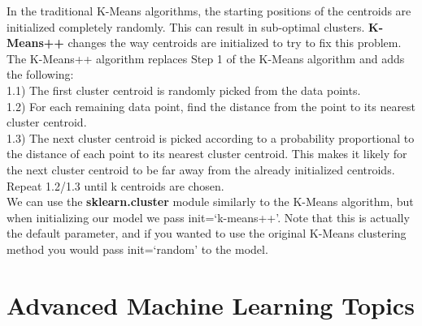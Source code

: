 \documentclass[11pt, a4paper]{article}
\begin{document}
\begin{spacing}{1.1}
	\noindent In the traditional K-Means algorithms, the starting positions of the centroids are initialized completely randomly. This can result in sub-optimal clusters. \textbf{K-Means++} changes the way centroids are initialized to try to fix this problem. \vspace*{2mm} \\
	The K-Means++ algorithm replaces Step 1 of the K-Means algorithm and adds the following: \\
	\hspace*{2mm} 1.1) The first cluster centroid is randomly picked from the data points. \\
	\hspace*{2mm} 1.2) For each remaining data point, find the distance from the point to its nearest cluster centroid. \\
	\hspace*{2mm} 1.3) The next cluster centroid is picked according to a probability proportional to the distance of each \hspace*{10mm} point to its nearest cluster centroid. This makes it likely for the next cluster centroid to be far \hspace*{10mm} away from the already initialized centroids. Repeat 1.2/1.3 until k centroids are chosen. \vspace*{2mm} \\
	We can use the \textbf{sklearn.cluster} module similarly to the K-Means algorithm, but when initializing our model we pass init=`k-means++'. Note that this is actually the default parameter, and if you wanted to use the original K-Means clustering method you would pass init=`random' to the model. \newpage

	\section{Advanced Machine Learning Topics}

\end{spacing}
\end{document}
